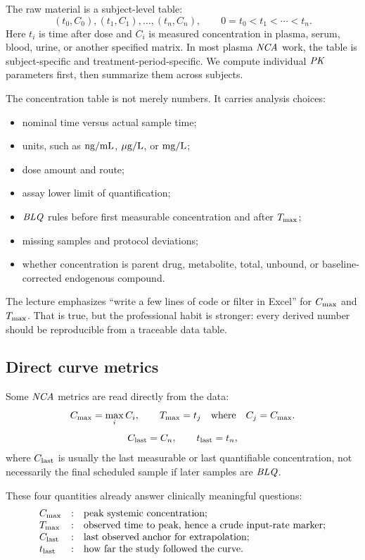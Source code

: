 \documentclass[a4paper]{article}
\newcommand{\Cmax}{\ensuremath{C_{\pklab{max}}}}
\newcommand{\Tmax}{\ensuremath{T_{\pklab{max}}}}
\newcommand{\Clast}{\ensuremath{C_{\pklab{last}}}}
\newcommand{\Tlast}{\ensuremath{t_{\pklab{last}}}}
\newcommand{\PK}{\ensuremath{\pksym{PK}}}
\newcommand{\NCA}{\ensuremath{\pksym{NCA}}}
\newcommand{\BLQ}{\ensuremath{\pksym{BLQ}}}
\begin{document}
The raw material is a subject-level table:
\[
  (t_0,C_0),(t_1,C_1),\ldots,(t_n,C_n),
  \qquad
  0=t_0<t_1<\cdots<t_n.
\]
Here \(t_i\) is time after dose and \(C_i\) is measured concentration in plasma, serum, blood, urine, or another specified matrix. In most plasma \NCA{} work, the table is subject-specific and treatment-period-specific. We compute individual \PK{} parameters first, then summarize them across subjects.

The concentration table is not merely numbers. It carries analysis choices:
\begin{itemize}[leftmargin=2em]
  \item nominal time versus actual sample time;
  \item units, such as \(\mathrm{ng/mL}\), \(\mathrm{\mu g/L}\), or \(\mathrm{mg/L}\);
  \item dose amount and route;
  \item assay lower limit of quantification;
  \item \BLQ{} rules before first measurable concentration and after \Tmax{};
  \item missing samples and protocol deviations;
  \item whether concentration is parent drug, metabolite, total, unbound, or baseline-corrected endogenous compound.
\end{itemize}

The lecture emphasizes ``write a few lines of code or filter in Excel'' for \Cmax{} and \Tmax{}. That is true, but the professional habit is stronger: every derived number should be reproducible from a traceable data table.

\subsection{Direct curve metrics}

Some \NCA{} metrics are read directly from the data:
\[
  \Cmax=\max_i C_i,
  \qquad
  \Tmax=t_j \quad\text{where}\quad C_j=\Cmax.
\]
\[
  \Clast=C_n,
  \qquad
  \Tlast=t_n,
\]
where \(\Clast\) is usually the last measurable or last quantifiable concentration, not necessarily the final scheduled sample if later samples are \BLQ{}.

These four quantities already answer clinically meaningful questions:
\[
\begin{array}{lll}
\Cmax &:& \text{peak systemic concentration;}\\
\Tmax &:& \text{observed time to peak, hence a crude input-rate marker;}\\
\Clast &:& \text{last observed anchor for extrapolation;}\\
\Tlast &:& \text{how far the study followed the curve.}
\end{array}
\]
\end{document}
